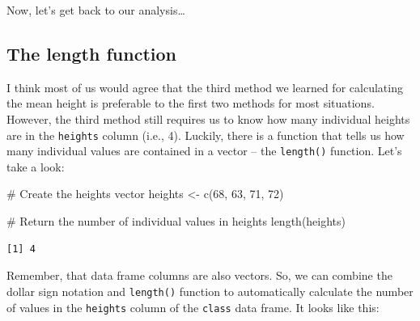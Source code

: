 \documentclass[
  letterpaper,
  DIV=11,
  numbers=noendperiod]{scrreprt}
\newenvironment{Shaded}{\begin{snugshade}}{\end{snugshade}}
\newcommand{\CommentTok}[1]{\textcolor[rgb]{0.37,0.37,0.37}{#1}}
\newcommand{\DecValTok}[1]{\textcolor[rgb]{0.68,0.00,0.00}{#1}}
\newcommand{\FunctionTok}[1]{\textcolor[rgb]{0.28,0.35,0.67}{#1}}
\newcommand{\NormalTok}[1]{\textcolor[rgb]{0.00,0.23,0.31}{#1}}
\newcommand{\OtherTok}[1]{\textcolor[rgb]{0.00,0.23,0.31}{#1}}
\newcommand{\SpecialCharTok}[1]{\textcolor[rgb]{0.37,0.37,0.37}{#1}}
\begin{document}
Now, let's get back to our analysis\ldots{}

\subsection{The length function}\label{the-length-function}

I think most of us would agree that the third method we learned for
calculating the mean height is preferable to the first two methods for
most situations. However, the third method still requires us to know how
many individual heights are in the \texttt{heights} column (i.e., 4).
Luckily, there is a function that tells us how many individual values
are contained in a vector -- the \texttt{length()} function. Let's take
a look:

\begin{Shaded}
\begin{Highlighting}[]
\CommentTok{\# Create the heights vector}
\NormalTok{heights }\OtherTok{\textless{}{-}} \FunctionTok{c}\NormalTok{(}\DecValTok{68}\NormalTok{, }\DecValTok{63}\NormalTok{, }\DecValTok{71}\NormalTok{, }\DecValTok{72}\NormalTok{)}

\CommentTok{\# Return the number of individual values in heights}
\FunctionTok{length}\NormalTok{(heights)}
\end{Highlighting}
\end{Shaded}

\begin{verbatim}
[1] 4
\end{verbatim}

Remember, that data frame columns are also vectors. So, we can combine
the dollar sign notation and \texttt{length()} function to automatically
calculate the number of values in the \texttt{heights} column of the
\texttt{class} data frame. It looks like this:

\begin{Shaded}
\end{Shaded}
\end{document}
